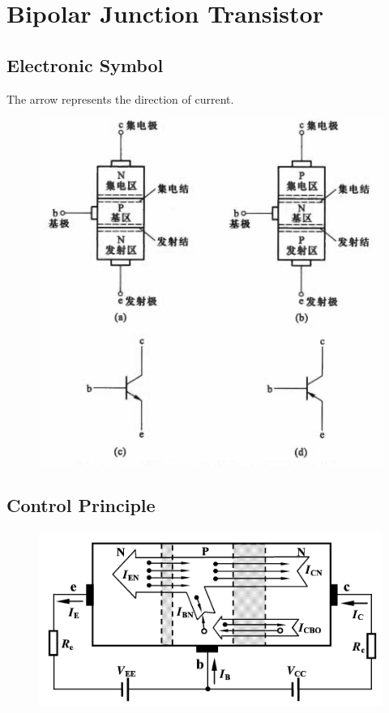 \chapter{Bipolar Junction Transistor}

\section{Electronic Symbol}

The arrow represents the direction of current.

\begin{figure}[H]
  \centering
  \includegraphics[width=0.7\linewidth]{figures/BJT-Symbol}
\end{figure}

\section{Control Principle}

\begin{figure}[H]
  \centering
  \includegraphics[width=0.7\linewidth]{figures/BJT-control-principle}
\end{figure}

